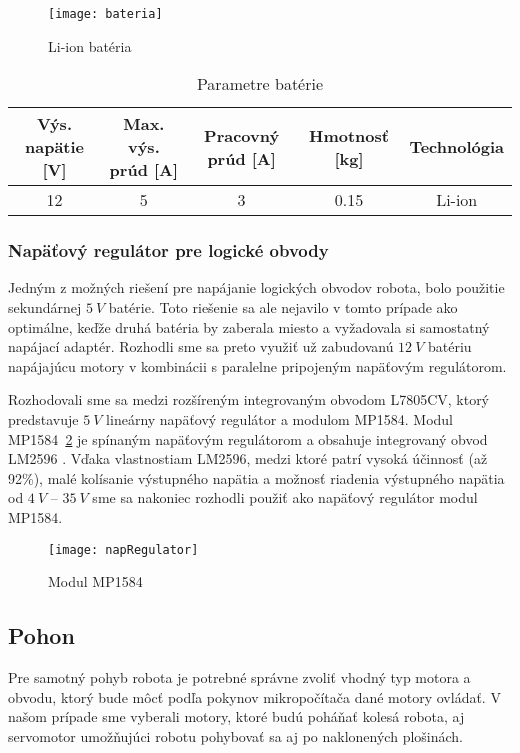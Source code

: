 \begin{figure}[h]
\centering
\texttt{[image: bateria]}
\caption{Li-ion batéria\cite{VariCore}}
\label{fig:bateria}
\end{figure}


\bgroup
\def\arraystretch{1.8}
\begin{table}[h]
\centering
\begin{tabular}{|c|c|c|c|c|}
\hline
Výs. napätie [V] & Max. výs. prúd [A] & Pracovný prúd [A]  & Hmotnosť [kg]&Technológia\\
\hline
 12& 5 & 3  & 0.15& Li-ion \\
\hline
\end{tabular}
\caption{Parametre batérie}
\label{tab:bateria}
\end{table}
\egroup

\subsubsection{Napäťový regulátor pre logické obvody}
Jedným z možných riešení pre napájanie logických obvodov robota, bolo použitie sekundárnej $5~V$ batérie. Toto riešenie sa ale nejavilo v tomto prípade ako optimálne, keďže druhá batéria by zaberala miesto a vyžadovala si samostatný napájací adaptér. Rozhodli sme sa preto využiť už zabudovanú $12~V$ batériu napájajúcu motory v kombinácii s paralelne pripojeným napäťovým regulátorom. 

Rozhodovali sme sa medzi rozšíreným integrovaným obvodom L7805CV, ktorý predstavuje $5~V$ lineárny napäťový regulátor a modulom MP1584. Modul MP1584\figurename~\ref{fig:napRegulator} je spínaným napäťovým regulátorom a obsahuje integrovaný obvod LM2596\cite{LM2596} . Vďaka vlastnostiam LM2596, medzi ktoré patrí vysoká účinnosť (až 92\%), malé kolísanie výstupného napätia a možnosť riadenia výstupného napätia od $4~V$ – $35~V$ sme sa nakoniec rozhodli použiť ako napäťový regulátor modul MP1584.

\begin{figure}[h!]
\centering
\texttt{[image: napRegulator]}
\caption{Modul MP1584\cite{MP1584}}
\label{fig:napRegulator}
\end{figure}

\subsection{Pohon}
Pre samotný pohyb robota je potrebné správne zvoliť vhodný typ motora a obvodu, ktorý bude môcť podľa pokynov mikropočítača dané motory ovládať. V našom prípade sme vyberali motory, ktoré budú poháňať kolesá robota, aj servomotor umožňujúci robotu pohybovať sa aj po naklonených plošinách.

